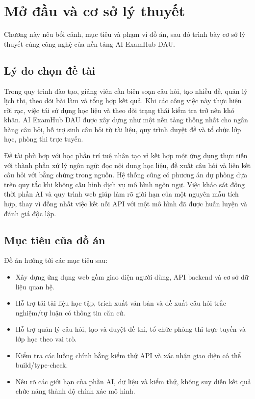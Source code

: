 \chapter{Mở đầu và cơ sở lý thuyết}
\label{ch:modau}

\begin{muctieu}
Chương này nêu bối cảnh, mục tiêu và phạm vi đồ án, sau đó trình bày cơ sở
lý thuyết cùng công nghệ của nền tảng AI ExamHub DAU.
\end{muctieu}

\section{Lý do chọn đề tài}

Trong quy trình đào tạo, giảng viên cần biên soạn câu hỏi, tạo nhiều đề,
quản lý lịch thi, theo dõi bài làm và tổng hợp kết quả. Khi các công việc
này thực hiện rời rạc, việc tái sử dụng học liệu và theo dõi trạng thái
kiểm tra trở nên khó khăn. AI ExamHub DAU được xây dựng như một nền tảng
thống nhất cho ngân hàng câu hỏi, hỗ trợ sinh câu hỏi từ tài liệu, quy trình
duyệt đề và tổ chức lớp học, phòng thi trực tuyến.

Đề tài phù hợp với học phần trí tuệ nhân tạo vì kết hợp một ứng dụng thực
tiễn với thành phần xử lý ngôn ngữ: đọc nội dung học liệu, đề xuất câu hỏi
và liên kết câu hỏi với bằng chứng trong nguồn. Hệ thống cũng có phương án
dự phòng dựa trên quy tắc khi không cấu hình dịch vụ mô hình ngôn ngữ. Việc
khảo sát đồng thời phần AI và quy trình web giúp làm rõ giới hạn của một
nguyên mẫu tích hợp, thay vì đồng nhất việc kết nối API với một mô hình đã
được huấn luyện và đánh giá độc lập.

\section{Mục tiêu của đồ án}

Đồ án hướng tới các mục tiêu sau:
\begin{itemize}[leftmargin=1.6em, itemsep=2pt]
  \item Xây dựng ứng dụng web gồm giao diện người dùng, API backend và cơ sở
        dữ liệu quan hệ.
  \item Hỗ trợ tải tài liệu học tập, trích xuất văn bản và đề xuất câu hỏi
        trắc nghiệm/tự luận có thông tin căn cứ.
  \item Hỗ trợ quản lý câu hỏi, tạo và duyệt đề thi, tổ chức phòng thi trực
        tuyến và lớp học theo vai trò.
  \item Kiểm tra các luồng chính bằng kiểm thử API và xác nhận giao diện có
        thể build/type-check.
  \item Nêu rõ các giới hạn của phần AI, dữ liệu và kiểm thử, không suy diễn
        kết quả chức năng thành độ chính xác mô hình.
\end{itemize}

